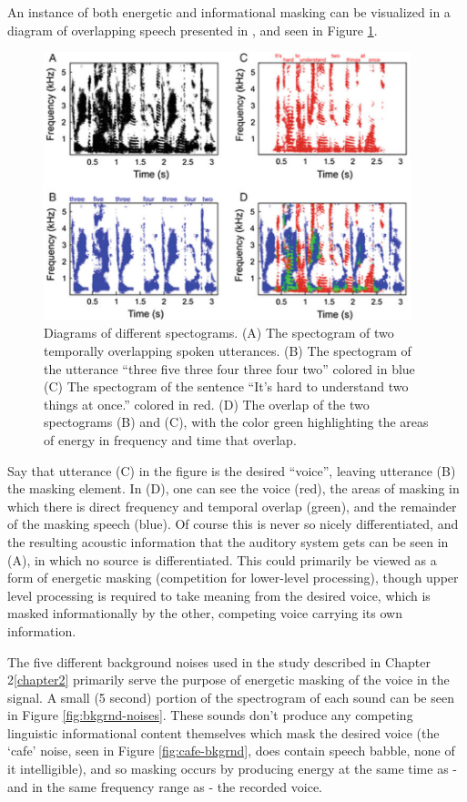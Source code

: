 \documentclass[dissertation,copyright]{uathesis}
\begin{document}
An instance of both energetic and informational masking can be visualized in a diagram of overlapping speech presented in \cite{middlebrooks:17}, and seen in Figure \ref{fig:sos-masked-spctgrms}.
%
\begin{figure}
\centering
  \includegraphics[width=0.95\textwidth]{figure/speech-on-speech_masked_spectrograms.png}
  \caption{Diagrams of different spectograms. (A) The spectogram of two temporally overlapping spoken utterances. (B) The spectogram of the utterance ``three five three four three four two'' colored in blue (C) The spectogram of the sentence ``It's hard to understand two things at once.'' colored in red. (D) The overlap of the two spectograms (B) and (C), with the color green highlighting the areas of energy in frequency and time that overlap. }
  \label{fig:sos-masked-spctgrms}
\end{figure}
%
Say that utterance (C) in the figure is the desired ``voice'', leaving utterance (B) the masking element.  In (D), one can see the voice (red), the areas of masking in which there is direct frequency and temporal overlap (green), and the remainder of the masking speech (blue). Of course this is never so nicely differentiated, and the resulting acoustic information that the auditory system gets can be seen in (A), in which no source is differentiated.  This could primarily be viewed as a form of energetic masking (competition for lower-level processing), though upper level processing is required to take meaning from the desired voice, which is masked informationally by the other, competing voice carrying its own information.

The five different background noises used in the study described in Chapter 2\ref{chapter2} primarily serve the purpose of energetic masking of the voice in the signal.  A small (5 second) portion of the spectrogram of each sound can be seen in Figure \ref{fig:bkgrnd-noises}.  These sounds don't produce any competing linguistic informational content themselves which mask the desired voice (the `cafe' noise, seen in Figure \ref{fig:cafe-bkgrnd}, does contain speech babble, none of it intelligible), and so masking occurs by producing energy at the same time as - and in the same frequency range as - the recorded voice.
\end{document}
